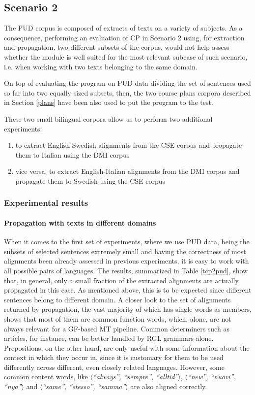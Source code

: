 \subsection{Scenario 2}

The PUD corpus is composed of extracts of texts on a variety of subjects. As a consequence, performing an evaluation of CP in Scenario 2 using, for extraction and propagation, two different subsets of the corpus, would not help assess whether the module is well suited for the most relevant subcase of such scenario, i.e. when working with two texts belonging to the same domain. \smallskip

On top of evaluating the program on PUD data dividing the set of sentences used so far into two equally sized subsets, then, the two course plans corpora described in Section \ref{plans} have been also used to put the program to the test. \smallskip

These two small bilingual corpora allow us to perform two additional experiments: \smallskip
\begin{enumerate}
    \item to extract English-Swedish alignments from the CSE corpus and propagate them to Italian using the DMI corpus
    \item vice versa, to extract English-Italian alignments from the DMI corpus and propagate them to Swedish using the CSE corpus
\end{enumerate} \smallskip

\subsubsection{Experimental results}

\paragraph{Propagation with texts in different domains}
When it comes to the first set of experiments, where we use PUD data, being the subsets of selected sentences extremely small and having the correctness of most alignments been already assessed in previous experiments, it is easy to work with all possible pairs of languages. The results, summarized in Table \ref{tcp2pud}, show that, in general, only a small fraction of the extracted alignments are actually propagated in this case. As mentioned above, this is to be expected since different sentences belong to different domain. A closer look to the set of alignments returned by propagation, the vast majority of which has single words as members, shows that most of them are common function words, which, alone, are not always relevant for a GF-based MT pipeline. 
Common determiners such as articles, for instance, can be better handled by RGL grammars alone. 
Prepositions, on the other hand, are only useful with some information about the context in which they occur in, since it is customary for them to be used differently across different, even closely related languages. 
However, some common content words, like $\langle$\textit{``always'', ``sempre'', ``alltid''}$\rangle$, $\langle$\textit{``new'', ``nuovi'', ``nya''}$\rangle$ and $\langle$\textit{``same'', ``stesso'', ``samma''}$\rangle$ are also aligned correctly.

